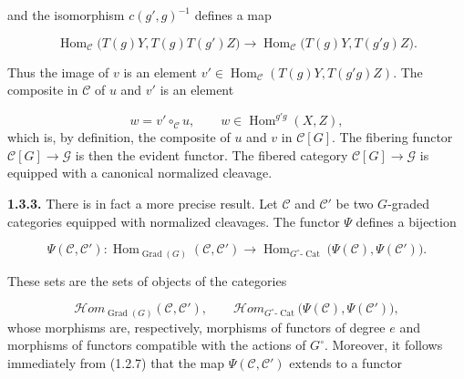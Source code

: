 %
and the isomorphism $c(g',g)^{-1}$ defines a map

\begin{equation}
  \operatorname{Hom}_{\mathcal C}
    \bigl(T(g)Y,T(g)T(g')Z\bigr)
  \longrightarrow
  \operatorname{Hom}_{\mathcal C}
    \bigl(T(g)Y,T(g'g)Z\bigr).
  \tag{1.3.2.4}
\end{equation}

Thus the image of $v$ is an element
$v'\in\operatorname{Hom}_{\mathcal C}(T(g)Y,T(g'g)Z)$. The composite in
$\mathcal C$ of $u$ and $v'$ is an element

\begin{equation}
  w=v'\mathbin{\circ_{\mathcal C}}u,
  \qquad w\in\operatorname{Hom}^{g'g}(X,Z),
  \tag{1.3.2.5}
\end{equation}
which is, by definition, the composite of $u$ and $v$ in
$\mathcal C[G]$. The fibering functor $\mathcal C[G]\to\mathcal G$ is
then the evident functor. The fibered category
$\mathcal C[G]\to\mathcal G$ is equipped with a canonical normalized
cleavage.

\noindent\textbf{1.3.3.}\quad
There is in fact a more precise result. Let $\mathcal C$ and
$\mathcal C'$ be two $G$-graded categories equipped with normalized
cleavages. The functor $\Psi$ defines a bijection

\begin{equation}
  \Psi(\mathcal C,\mathcal C')\colon
  \operatorname{Hom}_{\operatorname{Grad}(G)}(\mathcal C,\mathcal C')
  \longrightarrow
  \operatorname{Hom}_{G^\circ\text{-}\operatorname{Cat}}
    \bigl(\Psi(\mathcal C),\Psi(\mathcal C')\bigr).
  \tag{1.3.3.1}
\end{equation}

These sets are the sets of objects of the categories

\begin{equation}
  \mathcal{H}\!om_{\operatorname{Grad}(G)}(\mathcal C,\mathcal C'),
  \qquad
  \mathcal{H}\!om_{G^\circ\text{-}\operatorname{Cat}}
    \bigl(\Psi(\mathcal C),\Psi(\mathcal C')\bigr),
  \tag{1.3.3.2}
\end{equation}
whose morphisms are, respectively, morphisms of functors of degree $e$
and morphisms of functors compatible with the actions of $G^\circ$.
Moreover, it follows immediately from (1.2.7) that the map
$\Psi(\mathcal C,\mathcal C')$ extends to a functor

